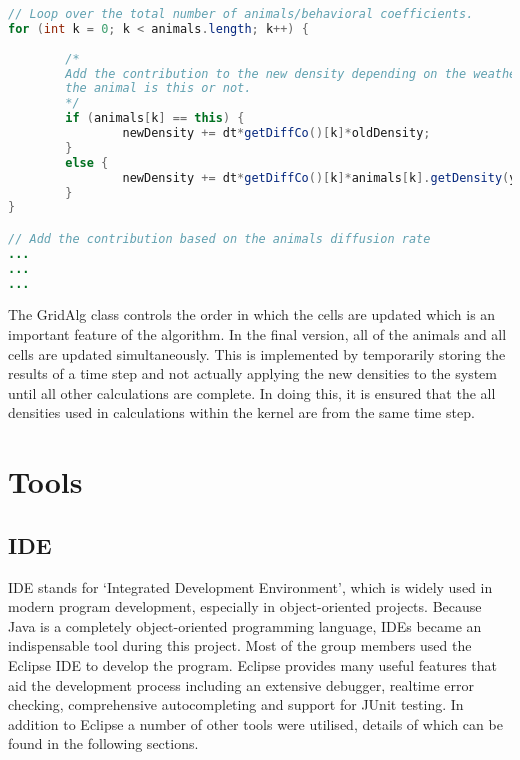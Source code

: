 \documentclass[11pt]{report}
\begin{document}
\begin{lstlisting}[numbers=none, language=Java,caption=The key part of the computational kernel within animal - called when the density for a single cell is to be updated to the next time step.]
// Loop over the total number of animals/behavioral coefficients.
for (int k = 0; k < animals.length; k++) {
			
		/*
		Add the contribution to the new density depending on the weather 
		the animal is this or not.
		*/
		if (animals[k] == this) {
				newDensity += dt*getDiffCo()[k]*oldDensity;
		} 
		else {
				newDensity += dt*getDiffCo()[k]*animals[k].getDensity(y, x)*oldDensity;
		}
}

// Add the contribution based on the animals diffusion rate
...
...
...
\end{lstlisting} 

The GridAlg class controls the order in which the cells are updated which is an important feature of the algorithm. In the final version, all of the animals and all cells are
updated simultaneously. This is implemented by temporarily storing the results of a time step
and not actually applying the new densities to the system until all other calculations are
complete. In doing this, it is ensured that the all densities used in calculations within the kernel are from the same time step.

\label{Input_Output}
      
\label{GUI}

   
   \section{Tools}
   
   	 
	 \subsection{IDE}
	 
	 IDE stands for `Integrated Development Environment', which is widely used in modern program development, especially in object-oriented projects. Because Java is a completely object-oriented programming language, IDEs became an indispensable tool during this project.
Most of the group members used the Eclipse IDE to develop the program. Eclipse provides many useful features that aid the development process including an extensive debugger, 
realtime error checking, comprehensive autocompleting and support for JUnit testing. In addition to Eclipse a number of other tools were utilised, details of which can be found in the following sections.\newline{}
\end{document}
